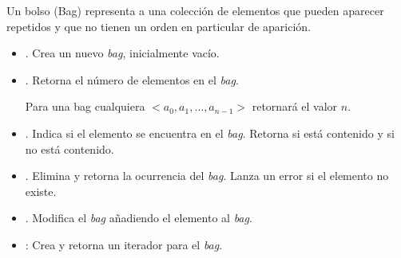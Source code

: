 

\begin{definition}[Bag]{}\label{def:Bag}

Un bolso (Bag) representa a una colección de elementos que pueden aparecer repetidos y que no tienen un orden en particular de aparición.

\begin{itemize}
\item {}. Crea un nuevo \textit{bag}, inicialmente vacío.

\item {}. Retorna el número de elementos en el \textit{bag}.

Para una bag cualquiera $<a_0, a_1, \ldots, a_{n-1}>$ retornará el valor $n$.

\item {}. Indica si el elemento  se encuentra en el \textit{bag}. Retorna  si está contenido y  si no está contenido.


\item {}. Elimina y retorna la ocurrencia  del \textit{bag}. Lanza un error si el elemento no existe.


\item {}. Modifica el \textit{bag} añadiendo  el elemento  al \textit{bag}.


\item {}: Crea y retorna un iterador para el \textit{bag}.
\end{itemize}
\end{definition}